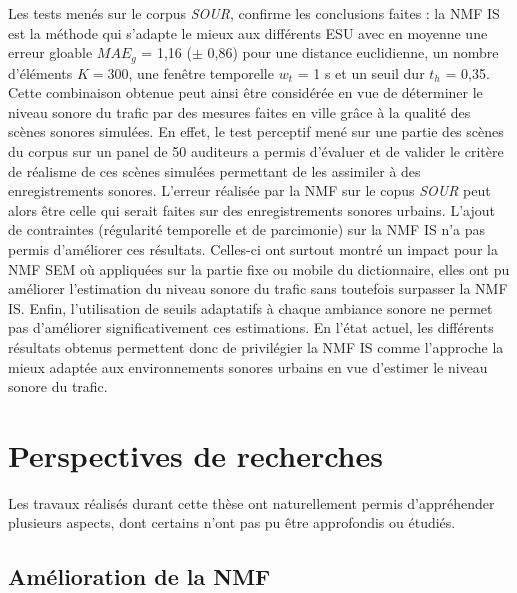 Les tests menés sur le corpus \textit{SOUR},  confirme les conclusions faites : la NMF IS est la méthode qui s'adapte le mieux aux différents ESU avec en moyenne une erreur gloable $MAE_g$ = 1,16 ($\pm$ 0,86) pour une distance euclidienne, un nombre d'éléments $K = 300$, une fenêtre temporelle $w_t$ = 1 s et un seuil dur $t_h$ = 0,35. Cette combinaison obtenue peut ainsi être considérée en vue de déterminer le niveau sonore du trafic par des mesures faites en ville grâce à la qualité des scènes sonores simulées. En effet, le test perceptif mené sur une partie des scènes du corpus sur un panel de 50 auditeurs a permis d'évaluer et de valider le critère de \og réalisme \fg{} de ces scènes simulées permettant de les assimiler à des enregistrements sonores. L'erreur réalisée par la NMF sur le copus \textit{SOUR} peut alors être celle qui serait faites sur des enregistrements sonores urbains.
L'ajout de contraintes (régularité temporelle et de parcimonie) sur la NMF IS n'a pas permis d'améliorer ces résultats. Celles-ci ont surtout montré un impact pour la NMF SEM où appliquées sur la partie fixe ou mobile du dictionnaire, elles ont pu améliorer l'estimation du niveau sonore du trafic sans toutefois surpasser la NMF IS. Enfin, l'utilisation de seuils adaptatifs à chaque ambiance sonore ne permet pas d'améliorer significativement ces estimations.
En l'état actuel, les différents résultats obtenus permettent donc de privilégier la NMF IS comme l'approche la mieux adaptée aux environnements sonores urbains en vue d'estimer le niveau sonore du trafic.


\section*{Perspectives de recherches}

Les travaux réalisés durant cette thèse ont naturellement permis d'appréhender plusieurs aspects, dont certains n'ont pas pu être approfondis ou étudiés.


\subsection*{Amélioration de la NMF}

